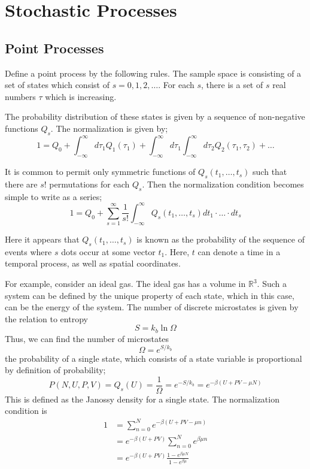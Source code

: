 \fullpageboxline



\chapter{Stochastic Processes}

\section{Point Processes}
Define a point process by the following rules. The sample space is consisting of a set of states which consist of $s = 0, 1, 2, \dots$. For each $s$, there is a set of $s$ real numbers $\tau$ which is increasing. 

The probability distribution of these states is given by a sequence of non-negative functions $Q_s$. The normalization is given by;
\begin{equation}
	1 = Q_0 + \int_{-\infty}^{\infty} d\tau_1 Q_1(\tau_1) + \int_{-\infty}^{\infty} d\tau_1\int_{-\infty}^{\infty} d\tau_2 Q_2(\tau_1, \tau_2) + \dots
\end{equation}

It is common to permit only symmetric functions of $Q_s(t_1, \dots, t_s)$ such that there are $s!$ permutations for each $Q_s$. Then the normalization condition becomes simple to write as a series;
\begin{equation}
	1 = Q_0 + \sum_{s=1}^\infty \frac{1}{s!}\int_{-\infty}^\infty Q_s(t_1, \dots, t_s) dt_1 \cdot \dots \cdot dt_s
\end{equation}

Here it appears that $Q_s(t_1, \dots, t_s)$ is known as the probability of the sequence of events where $s$ dots occur at some vector $t_1$. Here, $t$ can denote a time in a temporal process, as well as spatial coordinates. 

For example, consider an ideal gas. The ideal gas has a volume in $\mathbb{R}^3$. Such a system can be defined by the unique property of each state, which in this case, can be the energy of the system. The number of discrete microstates is given by the relation to entropy \[S = k_b \ln \Omega \] Thus, we can find the number of microstates \[\Omega = e^{S/k_b}\] the probability of a single state, which consists of a state variable is proportional by definition of probability;
\begin{equation}
	P(N, U, P, V) = Q_s(U) = \frac{1}{\Omega} = e^{-S/k_b} = e^{-\beta (U + PV - \mu N)}
\end{equation}
This is defined as the Janossy density for a single state. The normalization condition is 
\begin{align*}
	1 &= \sum_{n=0}^N e^{-\beta (U + PV - \mu n)} \\
	  &= e^{-\beta (U + PV)}\sum_{n=0}^N e^{\beta\mu n} \\
	  &= e^{-\beta (U + PV)}\frac{1-e^{\beta\mu N}}{1-e^{\beta\mu}} \\	
\end{align*}

